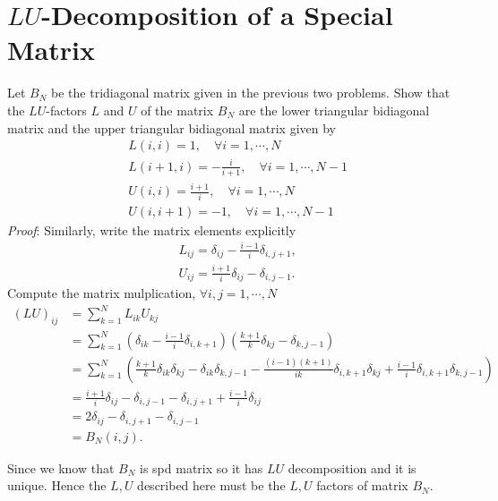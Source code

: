\documentclass[paper=a4, fontsize=11pt]{scrartcl} %
\numberwithin{equation}{section} %
\numberwithin{figure}{section} %
\numberwithin{table}{section} %
\begin{document}
\section{$LU$-Decomposition of a Special Matrix}
Let $B_N$ be the tridiagonal matrix given in the previous two problems. Show that the $LU$-factors $L$ and $U$ of the matrix $B_N$
are the lower triangular bidiagonal matrix and the upper triangular bidiagonal matrix given by
\begin{align}
\nonumber & L(i,i) = 1, \quad \forall i=1,\cdots,N \\
\nonumber & L(i+1,i) = -\frac{i}{i+1}, \quad \forall i=1,\cdots,N-1 \\
\nonumber & U(i,i) = \frac{i+1}{i}, \quad \forall i=1,\cdots,N \\
\nonumber & U(i,i+1) = -1, \quad \forall i=1,\cdots,N-1
\end{align}
\textit{Proof}: Similarly, write the matrix elements explicitly
\begin{align}
\nonumber &L_{ij} = \delta_{ij} - \frac{i-1}{i}\delta_{i,j+1},\\
\nonumber &U_{ij} = \frac{i+1}{i}\delta_{ij} - \delta_{i,j-1}.
\end{align}
Compute the matrix mulplication, $\forall i,j=1,\cdots,N$
\begin{align}
\nonumber \left(LU\right)_{ij} &= \sum_{k=1}^{N} L_{ik}U_{kj} \\
\nonumber &= \sum_{k=1}^{N}  \left( \delta_{ik} - \frac{i-1}{i}\delta_{i,k+1} \right)
\left( \frac{k+1}{k}\delta_{kj} - \delta_{k,j-1} \right) \\
\nonumber &= \sum_{k=1}^{N}  \left(  \frac{k+1}{k}\delta_{ik}\delta_{kj}  - \delta_{ik}\delta_{k,j-1} -  \frac{(i-1)(k+1)}{ik}\delta_{i,k+1}\delta_{kj} 
+ \frac{i-1}{i}\delta_{i,k+1}\delta_{k,j-1} \right) \\
\nonumber &= \frac{i+1}{i}\delta_{ij}  -\delta_{i,j-1} -\delta_{i,j+1}  + \frac{i-1}{i} \delta_{ij} \\
\nonumber &= 2\delta_{ij} - \delta_{i,j+1} - \delta_{i,j-1}\\
\nonumber &= B_N(i,j).
\end{align}

Since we know that $B_N$ is spd matrix so it has $LU$ decomposition and it is unique. Hence the $L, U$ described here must be the $L, U$ factors of matrix $B_N$.

\newpage
\end{document}
